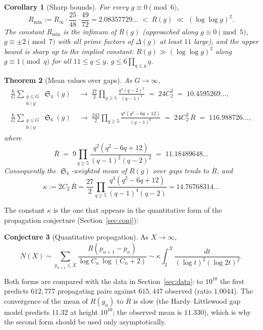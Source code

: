 \documentclass[11pt,a4paper]{article}
\theoremstyle{plain}
\newtheorem{theorem}{Theorem}[section]
\newtheorem{corollary}[theorem]{Corollary}
\theoremstyle{definition}
\newtheorem{conjecture}[theorem]{Conjecture}
\theoremstyle{remark}
\newcommand{\Rbar}{\overline{R}}
\newcommand{\Rinf}{R_{\infty}}
\newcommand{\Rmin}{R_{\min}}
\DeclareMathOperator{\Sing}{\mathfrak S}
\begin{document}
\begin{corollary}[Sharp bounds]\label{cor:bounds}
For every $g\equiv0\pmod 6$,
\[
\Rmin:=\Rinf\cdot\frac{25}{48}\cdot\frac{49}{72}=2.08357729\ldots\;<\;R(g)\;\ll\;(\log\log g)^2 .
\]
The constant $\Rmin$ is the infimum of $R(g)$ (approached along
$g\equiv0\pmod5$, $g\equiv\pm2\pmod7$ with all prime factors of $\Delta(g)$
at least $11$ large), and the upper bound is sharp up to the implied
constant: $R(g)\gg(\log\log g)^2$ along $g\equiv 1\pmod q$ for all
$11\le q\le y$, $g\le 6\prod_{q\le y}q$.
\end{corollary}

\begin{theorem}[Mean values over gaps]\label{thm:mean}
As $G\to\infty$,
\begin{align}
\frac6G\sum_{\substack{g\le G\\ 6\mid g}}\Sing_4(g)&\;\longrightarrow\;
\frac{27}{2}\prod_{q\ge5}\frac{q^2(q-2)^2}{(q-1)^4}\;=\;24C_2^2\;=\;10.4595269\ldots,\label{eq:mean4}\\
\frac6G\sum_{\substack{g\le G\\ 6\mid g}}\Sing_6(g)&\;\longrightarrow\;
\frac{243}{2}\prod_{q\ge5}\frac{q^4(q^2-6q+12)}{(q-1)^6}\;=\;24C_2^2\,\Rbar\;=\;116.988726\ldots,\label{eq:mean6}
\end{align}
where
\begin{equation}\label{eq:Rbar}
\Rbar\;=\;9\prod_{q\ge5}\frac{q^2(q^2-6q+12)}{(q-1)^2(q-2)^2}\;=\;11.18489648\ldots
\end{equation}
Consequently the $\Sing_4$-weighted mean of $R(g)$ over gaps tends to
$\Rbar$, and
\begin{equation}\label{eq:kappa}
\kappa:=2C_2\,\Rbar=\frac{27}{2}\prod_{q\ge5}\frac{q^3(q^2-6q+12)}{(q-1)^4(q-2)}=14.76768314\ldots
\end{equation}
\end{theorem}

The constant $\kappa$ is the one that appears in the quantitative form of
the propagation conjecture (Section~\ref{sec:conj}):
\begin{conjecture}[Quantitative propagation]\label{conj:A}
As $X\to\infty$,
\[
N(X)\sim\sum_{p_{n+1}\le X}\frac{R(p_{n+1}-p_n)}{\log C_n\,\log(C_n+2)}
\sim\kappa\int_2^X\frac{dt}{(\log t)^2(\log 2t)^2}.
\]
\end{conjecture}
\noindent
Both forms are compared with the data in Section~\ref{sec:data}: to $10^{10}$
the first predicts $612{,}777$ propagating pairs against $615{,}447$
observed (ratio $1.0044$).  The convergence of the mean of $R(g_n)$ to
$\Rbar$ is slow (the Hardy--Littlewood gap model predicts $11.32$ at height
$10^{10}$; the observed mean is $11.330$), which is why the second form
should be used only asymptotically.
\end{document}
